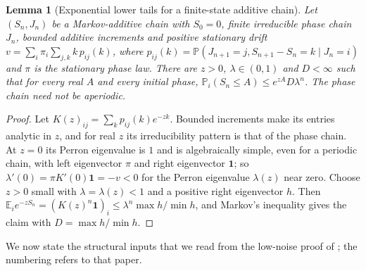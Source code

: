 \documentclass[11pt]{article}
\theoremstyle{plain}
\newtheorem{lemma}[theorem]{Lemma}
\theoremstyle{definition}
\theoremstyle{remark}
\newcommand{\E}{\mathbb{E}}
\newcommand{\Prob}{\mathbb{P}}
\begin{document}
\begin{lemma}[Exponential lower tails for a finite-state additive chain]
\label{lem:additive}
Let $(S_n,J_n)$ be a Markov-additive chain with $S_0=0$, finite irreducible phase chain $J_n$, bounded additive increments and positive stationary drift $v=\sum_i\pi_i\sum_{j,k}k\,p_{ij}(k)$, where $p_{ij}(k)=\Prob(J_{n+1}=j,S_{n+1}-S_n=k\mid J_n=i)$ and $\pi$ is the stationary phase law. There are $z>0$, $\lambda\in(0,1)$ and $D<\infty$ such that for every real $A$ and every initial phase, $\Prob_i(S_n\le A)\le e^{zA}D\lambda^n$. The phase chain need not be aperiodic.
\end{lemma}

\begin{proof}
Let $K(z)_{ij}=\sum_kp_{ij}(k)e^{-zk}$. Bounded increments make its entries analytic in $z$, and for real $z$ its irreducibility pattern is that of the phase chain. At $z=0$ its Perron eigenvalue is $1$ and is algebraically simple, even for a periodic chain, with left eigenvector $\pi$ and right eigenvector $\mathbf 1$; so $\lambda'(0)=\pi K'(0)\mathbf 1=-v<0$ for the Perron eigenvalue $\lambda(z)$ near zero. Choose $z>0$ small with $\lambda=\lambda(z)<1$ and a positive right eigenvector $h$. Then $\E_ie^{-zS_n}=(K(z)^n\mathbf 1)_i\le\lambda^n\max h/\min h$, and Markov's inequality gives the claim with $D=\max h/\min h$.
\end{proof}

We now state the structural inputs that we read from the low-noise proof of \cite[Section~5]{MST26}; the numbering refers to that paper.
\end{document}
